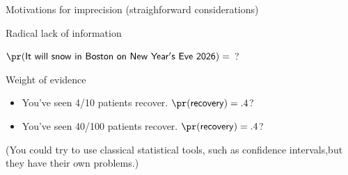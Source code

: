 \documentclass[10pt,ignorenonframetext,x11names, dvipsnames, bibspacing,natbib]{beamer}
\providecommand{\tightlist}{%
  \setlength{\itemsep}{0pt}\setlength{\parskip}{0pt}}
\begin{document}
\begin{frame}{Motivations for imprecision \large (straighforward
considerations)}

\pause

\begin{block}{Radical lack of information}

\(\pr(\mathsf{It \,\, will \,\, snow\,\, in\,\, Boston\,\, on \,\, New\,\, Year's\,\, Eve\,\, 2026}) =\)
?

\pause

\end{block}

\begin{block}{Weight of evidence}

\begin{itemize}
\tightlist
\item
  You've seen 4/10 patients recover. \(\pr(\mathsf{recovery})=.4\)?
\end{itemize}

\pause
\vspace{-2mm}

\begin{itemize}
\tightlist
\item
  You've seen 40/100 patients recover. \(\pr(\mathsf{recovery})=.4\)?
\end{itemize}

\footnotesize (You could try to use classical statistical tools, such as
confidence intervals,\linebreak  but they have their own problems.)

\end{block}

\end{frame}
\end{document}
